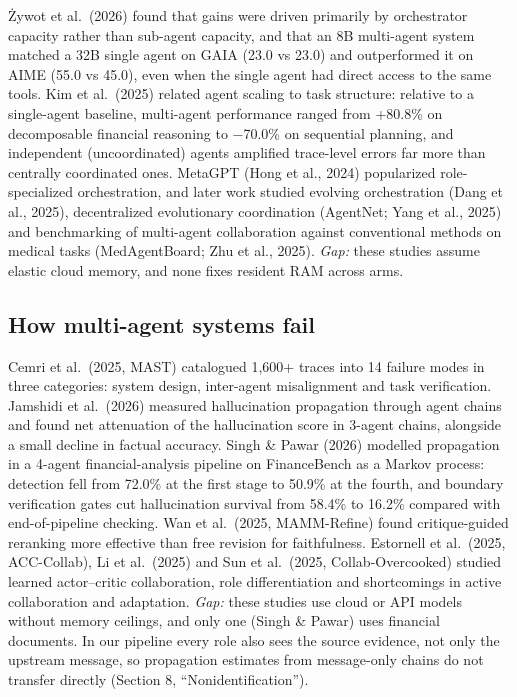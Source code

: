 \documentclass[letterpaper]{article}
\begin{document}
Żywot et al.~(2026) found that gains were driven primarily by orchestrator capacity rather than sub-agent capacity, and that an 8B multi-agent system matched a 32B single agent on GAIA (23.0 vs 23.0) and outperformed it on AIME (55.0 vs 45.0), even when the single agent had direct access to the same tools. Kim et al.~(2025) related agent scaling to task structure: relative to a single-agent baseline, multi-agent performance ranged from +80.8\% on decomposable financial reasoning to −70.0\% on sequential planning, and independent (uncoordinated) agents amplified trace-level errors far more than centrally coordinated ones. MetaGPT (Hong et al., 2024) popularized role-specialized orchestration, and later work studied evolving orchestration (Dang et al., 2025), decentralized evolutionary coordination (AgentNet; Yang et al., 2025) and benchmarking of multi-agent collaboration against conventional methods on medical tasks (MedAgentBoard; Zhu et al., 2025). \emph{Gap:} these studies assume elastic cloud memory, and none fixes resident RAM across arms.

\subsection{How multi-agent systems fail}\label{how-multi-agent-systems-fail}

Cemri et al.~(2025, MAST) catalogued 1,600+ traces into 14 failure modes in three categories: system design, inter-agent misalignment and task verification. Jamshidi et al.~(2026) measured hallucination propagation through agent chains and found net attenuation of the hallucination score in 3-agent chains, alongside a small decline in factual accuracy. Singh \& Pawar (2026) modelled propagation in a 4-agent financial-analysis pipeline on FinanceBench as a Markov process: detection fell from 72.0\% at the first stage to 50.9\% at the fourth, and boundary verification gates cut hallucination survival from 58.4\% to 16.2\% compared with end-of-pipeline checking. Wan et al.~(2025, MAMM-Refine) found critique-guided reranking more effective than free revision for faithfulness. Estornell et al.~(2025, ACC-Collab), Li et al.~(2025) and Sun et al.~(2025, Collab-Overcooked) studied learned actor--critic collaboration, role differentiation and shortcomings in active collaboration and adaptation. \emph{Gap:} these studies use cloud or API models without memory ceilings, and only one (Singh \& Pawar) uses financial documents. In our pipeline every role also sees the source evidence, not only the upstream message, so propagation estimates from message-only chains do not transfer directly (Section 8, ``Nonidentification'').
\end{document}
